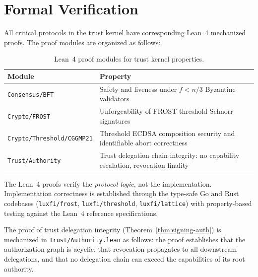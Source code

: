 \section{Formal Verification}
\label{sec:verification}

All critical protocols in the trust kernel have corresponding Lean~4 mechanized
proofs. The proof modules are organized as follows:

\begin{table}[h]
\centering
\caption{Lean~4 proof modules for trust kernel properties.}
\label{tab:proofs}
\begin{tabular}{lp{7cm}}
\toprule
\textbf{Module} & \textbf{Property} \\
\midrule
\texttt{Consensus/BFT} & Safety and liveness under $f < n/3$ Byzantine
    validators \\
\texttt{Crypto/FROST} & Unforgeability of FROST threshold Schnorr
    signatures \\
\texttt{Crypto/Threshold/CGGMP21} & Threshold ECDSA composition security
    and identifiable abort correctness \\
\texttt{Trust/Authority} & Trust delegation chain integrity: no capability
    escalation, revocation finality \\
\bottomrule
\end{tabular}
\end{table}

\begin{remark}
The Lean~4 proofs verify the \emph{protocol logic}, not the implementation.
Implementation correctness is established through the type-safe Go and Rust
codebases (\texttt{luxfi/frost}, \texttt{luxfi/threshold}, \texttt{luxfi/lattice})
with property-based testing against the Lean~4 reference specifications.
\end{remark}

The proof of trust delegation integrity (Theorem~\ref{thm:signing-auth}) is
mechanized in \texttt{Trust/Authority.lean} as follows: the proof establishes
that the authorization graph is acyclic, that revocation propagates to all
downstream delegations, and that no delegation chain can exceed the
capabilities of its root authority.

